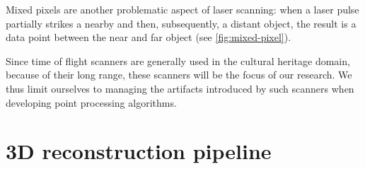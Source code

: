 Mixed pixels are another problematic aspect of laser scanning: when a laser pulse partially strikes a nearby and then, subsequently, a distant object, the result is a data point between the near and far object \cite{Tuley2005} (see \autoref{fig:mixed-pixel}).


Since time of flight scanners are generally used in the cultural heritage domain, because of their long range, these scanners will be the focus of our research. We thus limit ourselves to managing the artifacts introduced by such scanners when developing point processing algorithms.


\section{3D reconstruction pipeline} \label{sec:pipeline}


